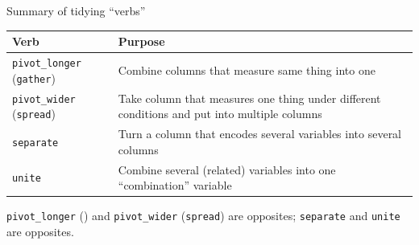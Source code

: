 \documentclass[
  ignorenonframetext,
]{beamer}
\begin{document}
\begin{frame}{Summary of tidying ``verbs''}
\protect\hypertarget{summary-of-tidying-verbs}{}

\begin{tabular}{lp{}}
    Verb & Purpose\\
    \hline
    \texttt{pivot\_longer} (\texttt{gather}) & Combine columns that measure same thing into one\\
    \texttt{pivot\_wider} (\texttt{spread}) & Take column that measures one thing under
                     different conditions and put into multiple columns\\
    \texttt{separate} & Turn a column that encodes
                        several variables into
                        several columns\\
    \texttt{unite} & Combine several (related) variables into one
                     ``combination'' variable\\
    \hline
  \end{tabular}

\texttt{pivot\_longer} () and \texttt{pivot\_wider}
(\texttt{spread}) are opposites; \texttt{separate} and \texttt{unite}
are opposites.

\end{frame}
\end{document}
